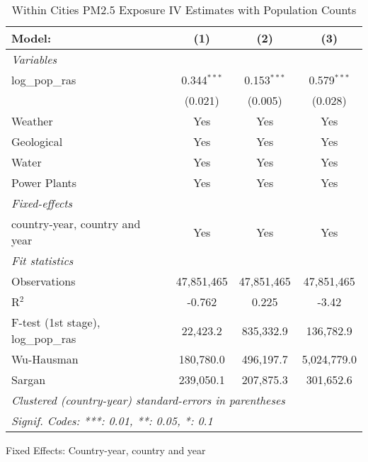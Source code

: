 
\begin{table}[htbp]
   \caption{Within Cities PM2.5 Exposure IV Estimates with Population Counts}
   \centering
   \small
   \begin{tabular}{lccc}
      \tabularnewline \midrule \midrule
      Model:                          & (1)           & (2)           & (3)\\  
      \midrule
      \emph{Variables}\\
      log\_pop\_ras                   & 0.344$^{***}$ & 0.153$^{***}$ & 0.579$^{***}$\\   
                                      & (0.021)       & (0.005)       & (0.028)\\   
      Weather                         & Yes           & Yes           & Yes\\  
      Geological                      & Yes           & Yes           & Yes\\  
      Water                           & Yes           & Yes           & Yes\\  
      Power Plants                    & Yes           & Yes           & Yes\\  
      \midrule
      \emph{Fixed-effects}\\
      country-year, country and year  & Yes           & Yes           & Yes\\  
      \midrule
      \emph{Fit statistics}\\
      Observations                    & 47,851,465    & 47,851,465    & 47,851,465\\  
      R$^2$                           & -0.762        & 0.225         & -3.42\\  
      F-test (1st stage), log_pop_ras & 22,423.2      & 835,332.9     & 136,782.9\\  
      Wu-Hausman                      & 180,780.0     & 496,197.7     & 5,024,779.0\\  
      Sargan                          & 239,050.1     & 207,875.3     & 301,652.6\\  
      \midrule \midrule
      \multicolumn{4}{l}{\emph{Clustered (country-year) standard-errors in parentheses}}\\
      \multicolumn{4}{l}{\emph{Signif. Codes: ***: 0.01, **: 0.05, *: 0.1}}\\
   \end{tabular}
   
   \par \raggedright 
   Fixed Effects: Country-year, country and year
\end{table}


